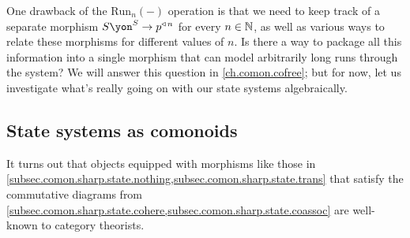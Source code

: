 \documentclass[Book-Poly]{subfiles}
\begin{document}
One drawback of the $\text{Run}_n(-)$ operation is that we need to keep track of a separate morphism $S\yon^S\to p\tripow{n}$ for every $n\in\mathbb{N}$, as well as various ways to relate these morphisms for different values of $n$.
Is there a way to package all this information into a single morphism that can model arbitrarily long runs through the system?
We will answer this question in \cref{ch.comon.cofree}; but for now, let us investigate what's really going on with our state systems algebraically.

\subsection{State systems as comonoids}

It turns out that objects equipped with morphisms like those in \cref{subsec.comon.sharp.state.nothing,subsec.comon.sharp.state.trans} that satisfy the commutative diagrams from \cref{subsec.comon.sharp.state.cohere,subsec.comon.sharp.state.coassoc} are well-known to category theorists.
\end{document}
